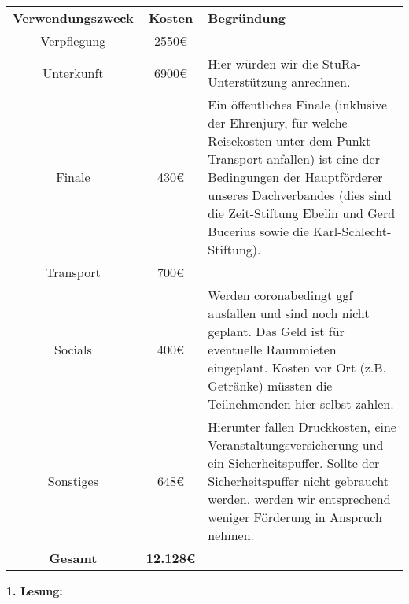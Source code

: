 {    \vspace*{2em}
    \newline
    \begin{tabular}{c c p{10cm}}
        \textbf{Verwendungszweck} & \textbf{Kosten} & \textbf{Begründung} \\
        Verpflegung & 2550€ & \\
        Unterkunft & 6900€ & Hier würden wir die StuRa-Unterstützung anrechnen.\\
        Finale & 430€ & Ein öffentliches Finale (inklusive der Ehrenjury, für welche Reisekosten unter dem Punkt Transport anfallen) ist eine der Bedingungen der Hauptförderer unseres Dachverbandes (dies sind die Zeit-Stiftung Ebelin und Gerd Bucerius sowie die Karl-Schlecht-Stiftung). \\
        Transport & 700€ & \\
        Socials & 400€ & Werden coronabedingt ggf ausfallen und sind noch nicht geplant. Das Geld ist für eventuelle Raummieten eingeplant. Kosten vor Ort (z.B. Getränke) müssten die Teilnehmenden hier selbst zahlen. \\
        Sonstiges & 648€ & Hierunter fallen Druckkosten, eine Veranstaltungsversicherung und ein Sicherheitspuffer. Sollte der Sicherheitspuffer nicht gebraucht werden, werden wir entsprechend weniger Förderung in Anspruch nehmen. \\ 
        \textbf{Gesamt} & \textbf{12.128€} & \\       
    \end{tabular}
}{
    \textbf{1. Lesung:}
    \ul{}

}

